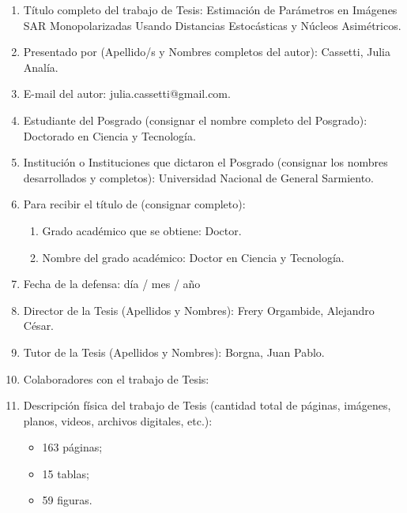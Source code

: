 \begin{enumerate}
	\item Título completo del trabajo de Tesis: Estimación de Parámetros en Imágenes SAR Monopolarizadas Usando Distancias Estocásticas y Núcleos Asimétricos.

	\item Presentado por (Apellido/s y Nombres completos del autor): Cassetti, Julia Analía.

	\item E-mail del autor: julia.cassetti@gmail.com.

	\item Estudiante del Posgrado (consignar el nombre completo del Posgrado): Doctorado en Ciencia y Tecnología.

	\item Institución o Instituciones que dictaron el Posgrado (consignar los nombres
desarrollados y completos): Universidad Nacional de General Sarmiento.

	\item Para recibir el título de (consignar completo):

	\begin{enumerate}%
	\item Grado académico que se obtiene: Doctor.
	\item Nombre del grado académico: Doctor en Ciencia y Tecnología.
	\end{enumerate}

	\item Fecha de la defensa: día / mes / año %

	\item Director de la Tesis (Apellidos y Nombres): Frery Orgambide, Alejandro César.

	\item Tutor de la Tesis (Apellidos y Nombres): Borgna, Juan Pablo.

	\item Colaboradores con el trabajo de Tesis: 

	\item Descripción física del trabajo de Tesis (cantidad total de páginas, imágenes, planos, videos, archivos digitales, etc.):
	\begin{itemize}%
		\item 163 páginas;
		\item 15 tablas;
		\item 59 figuras.
	\end{itemize}


\end{enumerate}

